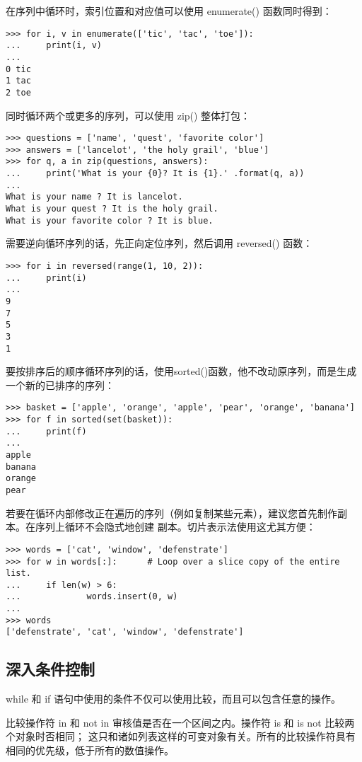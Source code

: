 \documentclass[UTF8]{ctexart}
\begin{document}
在序列中循环时，索引位置和对应值可以使用 enumerate() 函数同时得到：
\begin{verbatim}
>>> for i, v in enumerate(['tic', 'tac', 'toe']):
...     print(i, v)
...
0 tic
1 tac
2 toe
\end{verbatim}

同时循环两个或更多的序列，可以使用 zip() 整体打包：
\begin{verbatim}
>>> questions = ['name', 'quest', 'favorite color']
>>> answers = ['lancelot', 'the holy grail', 'blue']
>>> for q, a in zip(questions, answers):
...     print('What is your {0}? It is {1}.' .format(q, a))
...
What is your name ? It is lancelot.
What is your quest ? It is the holy grail.
What is your favorite color ? It is blue.
\end{verbatim}

需要逆向循环序列的话，先正向定位序列，然后调用 reversed() 函数：
\begin{verbatim}
>>> for i in reversed(range(1, 10, 2)):
...     print(i)
...
9
7
5
3
1
\end{verbatim}

要按排序后的顺序循环序列的话，使用sorted()函数，他不改动原序列，而是生成一个新的已排序的序列：
\begin{verbatim}
>>> basket = ['apple', 'orange', 'apple', 'pear', 'orange', 'banana']
>>> for f in sorted(set(basket)):
...     print(f)
...
apple
banana
orange
pear
\end{verbatim}

若要在循环内部修改正在遍历的序列（例如复制某些元素），建议您首先制作副本。在序列上循环不会隐式地创建
副本。切片表示法使用这尤其方便：
\begin{verbatim}
>>> words = ['cat', 'window', 'defenstrate']
>>> for w in words[:]:      # Loop over a slice copy of the entire list.
...     if len(w) > 6:
...             words.insert(0, w)
...
>>> words
['defenstrate', 'cat', 'window', 'defenstrate']
\end{verbatim}

\subsection{深入条件控制}
while 和 if 语句中使用的条件不仅可以使用比较，而且可以包含任意的操作。

比较操作符 in 和 not in 审核值是否在一个区间之内。操作符 is 和 is not 比较两个对象时否相同；
这只和诸如列表这样的可变对象有关。所有的比较操作符具有相同的优先级，低于所有的数值操作。
\end{document}
